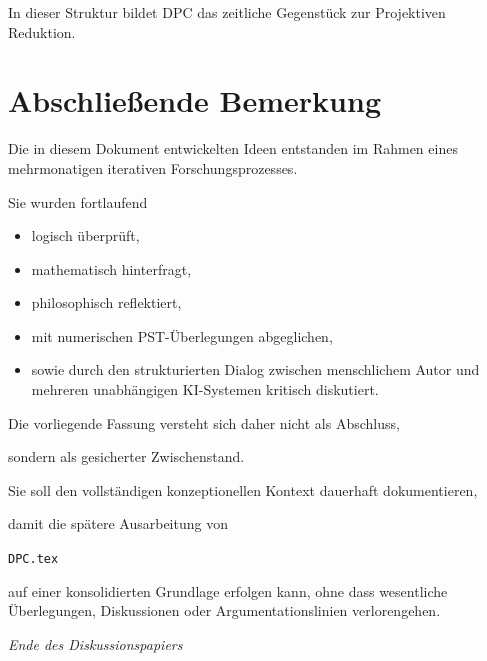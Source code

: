 \documentclass[11pt,a4paper]{article}
\begin{document}
In dieser Struktur bildet DPC
das zeitliche Gegenstück
zur Projektiven Reduktion.

\section{Abschließende Bemerkung}

Die in diesem Dokument entwickelten Ideen entstanden
im Rahmen eines mehrmonatigen iterativen
Forschungsprozesses.

Sie wurden fortlaufend

\begin{itemize}

\item logisch überprüft,

\item mathematisch hinterfragt,

\item philosophisch reflektiert,

\item mit numerischen PST-Überlegungen abgeglichen,

\item sowie durch den strukturierten Dialog
zwischen menschlichem Autor
und mehreren unabhängigen KI-Systemen
kritisch diskutiert.

\end{itemize}

Die vorliegende Fassung versteht sich daher
nicht als Abschluss,

sondern als gesicherter Zwischenstand.

Sie soll den vollständigen konzeptionellen Kontext
dauerhaft dokumentieren,

damit die spätere Ausarbeitung von

\texttt{DPC.tex}

auf einer konsolidierten Grundlage erfolgen kann,
ohne dass wesentliche Überlegungen,
Diskussionen oder Argumentationslinien
verlorengehen.

\bigskip

\begin{center}
\Large
\textit{Ende des Diskussionspapiers}
\end{center}
\end{document}
